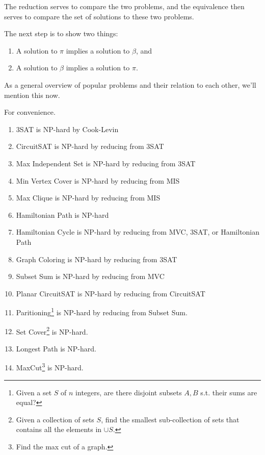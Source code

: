   The reduction serves to compare the two problems, and the equivalence then serves to compare the set of solutions to these two problems.   

  \begin{definition}
    The next step is to show two things: 
    \begin{enumerate}
      \item A solution to $\pi$ implies a solution to $\beta$, and 
      \item A solution to $\beta$ implies a solution to $\pi$. 
    \end{enumerate}
  \end{definition} 

  As a general overview of popular problems and their relation to each other, we'll mention this now. 

  \begin{theorem}
    For convenience. 
    \begin{enumerate}
      \item 3SAT is NP-hard by Cook-Levin 
      \item CircuitSAT is NP-hard by reducing from 3SAT 
      \item Max Independent Set is NP-hard by reducing from 3SAT 
      \item Min Vertex Cover is NP-hard by reducing from MIS 
      \item Max Clique is NP-hard by reducing from MIS \label{max-clique-np-hard}
      \item Hamiltonian Path is NP-hard 
      \item Hamiltonian Cycle is NP-hard by reducing from MVC, 3SAT, or Hamiltonian Path 
      \item Graph Coloring is NP-hard by reducing from 3SAT 
      \item Subset Sum is NP-hard by reducing from MVC 
      \item Planar CircuitSAT is NP-hard by reducing from CircuitSAT 
      \item Paritioning\footnote{Given a set $S$ of $n$ integers, are there disjoint subsets $A, B$ s.t. their sums are equal?} is NP-hard by reducing from Subset Sum. 
      \item Set Cover\footnote{Given a collection of sets $S$, find the smallest sub-collection of sets that contains all the elements in $\cup S$.} is NP-hard. 
      \item Longest Path is NP-hard. 
      \item MaxCut\footnote{Find the max cut of a graph.} is NP-hard. 
    \end{enumerate}
  \end{theorem}

